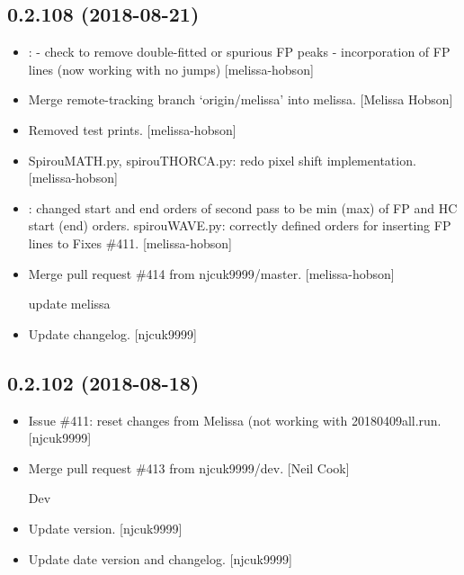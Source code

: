 \documentclass[a4paper,10pt,english]{report}
\begin{document}
\subsection{0.2.108 (2018-08-21)}
\label{\detokenize{misc/changelog:id360}}\begin{itemize}
\item {} 
: - check to remove double-fitted or
spurious FP peaks - incorporation of FP lines (now working with no
jumps) {[}melissa-hobson{]}

\item {} 
Merge remote-tracking branch ‘origin/melissa’ into melissa. {[}Melissa
Hobson{]}

\item {} 
Removed test prints. {[}melissa-hobson{]}

\item {} 
SpirouMATH.py, spirouTHORCA.py: redo pixel shift implementation.
{[}melissa-hobson{]}

\item {} 
: changed start and end orders of second pass to
be min (max) of FP and HC start (end) orders. spirouWAVE.py: correctly
defined orders for inserting FP lines to  Fixes \#411.
{[}melissa-hobson{]}

\item {} 
Merge pull request \#414 from njcuk9999/master. {[}melissa-hobson{]}

update melissa

\item {} 
Update changelog. {[}njcuk9999{]}

\end{itemize}


\subsection{0.2.102 (2018-08-18)}
\label{\detokenize{misc/changelog:id361}}\begin{itemize}
\item {} 
Issue \#411: reset  changes from Melissa (not working with
 20180409all.run. {[}njcuk9999{]}

\item {} 
Merge pull request \#413 from njcuk9999/dev. {[}Neil Cook{]}

Dev

\item {} 
Update version. {[}njcuk9999{]}

\item {} 
Update date version and changelog. {[}njcuk9999{]}

\end{itemize}
\end{document}
